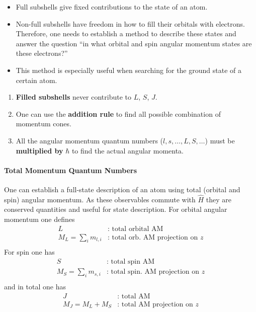 \begin{itemize}
    \item Full subshells give fixed contributions to the state of an atom.
    \item Non-full subshells have freedom in how to fill their orbitals with electrons. Therefore, one needs to establish a method to describe these states and answer the question ``in what orbital and spin angular momentum states are these electrons?''
    \item This method is especially useful when searching for the ground state of a certain atom.
\end{itemize}


\begin{enumerate}
    \item \textbf{Filled subshells} never contribute to $L$, $S$, $J$.
    \item One can use the \textbf{addition rule} to find all possible combination of momentum cones.
    \item All the angular momentum quantum numbers ($l,s,\dots,L,S,\dots$) must be \textbf{multiplied by} $\boldsymbol{\hbar}$ to find the actual angular momenta.
\end{enumerate}

\paragraph{Total Momentum Quantum Numbers}


One can establish a full-state description of an atom using total (orbital and spin) angular momentum. As these observables commute with $\hat{H}$ they are conserved quantities and useful for state description. For orbital angular momentum one defines
\begin{align*}
    L                   & \text{: total orbital AM}                \\
    M_L=\sum_{i}m_{l,i} & \text{: total orb. AM projection on $z$} \\
\end{align*}
For spin one has 
\begin{align*}
    S                   & \text{: total spin AM}                    \\
    M_S=\sum_{i}m_{s,i} & \text{: total spin. AM projection on $z$} \\
\end{align*}
and in total one has
\begin{align*}
    J           & \text{: total AM}                   \\
    M_J=M_L+M_S & \text{: total AM projection on $z$} \\
\end{align*}

